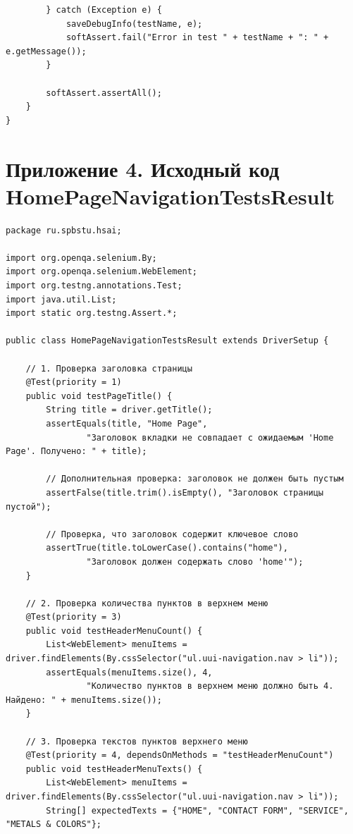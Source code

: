 \documentclass{article}[14pt]
\begin{document}
\begin{lstlisting}
        } catch (Exception e) {
            saveDebugInfo(testName, e);
            softAssert.fail("Error in test " + testName + ": " + e.getMessage());
        }

        softAssert.assertAll();
    }
}
\end{lstlisting}

\pagebreak

\section*{Приложение 4. Исходный код \\HomePageNavigationTestsResult}

\begin{lstlisting}
package ru.spbstu.hsai;

import org.openqa.selenium.By;
import org.openqa.selenium.WebElement;
import org.testng.annotations.Test;
import java.util.List;
import static org.testng.Assert.*;

public class HomePageNavigationTestsResult extends DriverSetup {

    // 1. Проверка заголовка страницы
    @Test(priority = 1)
    public void testPageTitle() {
        String title = driver.getTitle();
        assertEquals(title, "Home Page",
                "Заголовок вкладки не совпадает с ожидаемым 'Home Page'. Получено: " + title);

        // Дополнительная проверка: заголовок не должен быть пустым
        assertFalse(title.trim().isEmpty(), "Заголовок страницы пустой");

        // Проверка, что заголовок содержит ключевое слово
        assertTrue(title.toLowerCase().contains("home"),
                "Заголовок должен содержать слово 'home'");
    }

    // 2. Проверка количества пунктов в верхнем меню
    @Test(priority = 3)
    public void testHeaderMenuCount() {
        List<WebElement> menuItems = driver.findElements(By.cssSelector("ul.uui-navigation.nav > li"));
        assertEquals(menuItems.size(), 4,
                "Количество пунктов в верхнем меню должно быть 4. Найдено: " + menuItems.size());
    }

    // 3. Проверка текстов пунктов верхнего меню
    @Test(priority = 4, dependsOnMethods = "testHeaderMenuCount")
    public void testHeaderMenuTexts() {
        List<WebElement> menuItems = driver.findElements(By.cssSelector("ul.uui-navigation.nav > li"));
        String[] expectedTexts = {"HOME", "CONTACT FORM", "SERVICE", "METALS & COLORS"};


\end{lstlisting}
\end{document}
